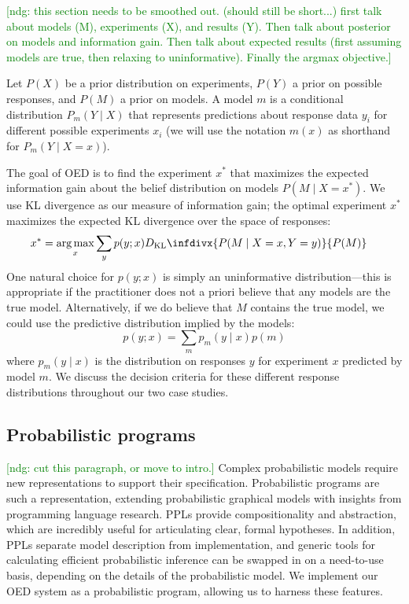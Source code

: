 \documentclass{article}
\newcommand{\dkl}{D_\mathrm{KL}\infdivx}
\newcommand{\ndg}[1]{\textcolor{Green}{[ndg: #1]}}
\DeclareMathOperator*{\argmax}{arg\,max}
\begin{document}
\ndg{this section needs to be smoothed out. (should still be short...) first talk about models (M), experiments (X), and results (Y). Then talk about posterior on models and information gain. Then talk about expected results (first assuming models are true, then relaxing to uninformative). Finally the argmax objective.}

Let $P(X)$ be a prior distribution on experiments, $P(Y)$ a prior on possible responses, and $P(M)$ a prior on models.
A model $m$ is a conditional distribution $P_m(Y \mid X)$ that represents predictions about response data $y_i$ for different possible experiments $x_i$ (we will use the notation $m(x)$ as shorthand for $P_m(Y \mid X = x)$).

The goal of OED is to find the experiment $x^{*}$ that maximizes the expected information gain about the belief distribution on models $P(M \mid X = x^{*})$.
We use KL divergence as our measure of information gain; the optimal experiment $x^*$ maximizes the expected KL divergence over the space of responses:
\begin{align}
x^{*} &= \argmax_{x} \sum\limits_{y} p(y ; x) \dkl{ P(M \mid X = x, Y = y) }{ P(M) } \label{eq:oed}
\end{align}
One natural choice for $p(y ; x)$ is simply an uninformative distribution---this is appropriate if the practitioner does not a priori believe that any models are the true model.
Alternatively, if we do believe that $M$ contains the true model, we could use the predictive distribution implied by the models:
$$ p(y ; x) = \sum\limits_{m}p_m(y \mid x)p(m) $$
where $p_m(y \mid x)$ is the distribution on responses $y$ for experiment $x$ predicted by model $m$.
We discuss the decision criteria for these different response distributions throughout our two case studies.

\subsection{Probabilistic programs}

\ndg{cut this paragraph, or move to intro.}
Complex probabilistic models require new representations to support their specification. Probabilistic programs are such a representation, extending probabilistic graphical models with insights from programming language research.
PPLs provide compositionality and abstraction, which are incredibly useful for articulating clear, formal hypotheses. In addition, PPLs separate model description from implementation, and generic tools for calculating efficient probabilistic inference can be swapped in on a need-to-use basis, depending on the details of the probabilistic model.
We implement our OED system as a probabilistic program, allowing us to harness these features.
\end{document}
